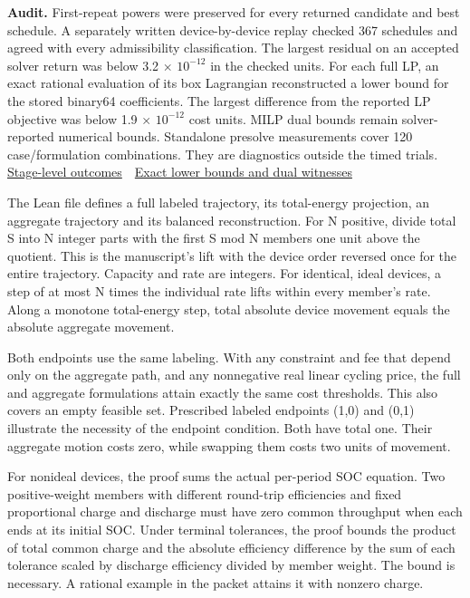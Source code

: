 \documentclass[11pt,letterpaper]{article}
\newcommand{\secname}[1]{\vspace*{2pt}{\LARGE\bfseries\color{accent}#1\par}\vspace{5pt}}
\begin{document}
\textbf{Audit.} First-repeat powers were preserved for every returned candidate and best schedule. A separately written device-by-device replay checked 367 schedules and agreed with every admissibility classification. The largest residual on an accepted solver return was below 3.2 \ensuremath{\times} \ensuremath{10^{-12}} in the checked units. For each full LP, an exact rational evaluation of its box Lagrangian reconstructed a lower bound for the stored binary64 coefficients. The largest difference from the reported LP objective was below 1.9 \ensuremath{\times} \ensuremath{10^{-12}} cost units. MILP dual bounds remain solver-reported numerical bounds. Standalone presolve measurements cover 120 case/formulation combinations. They are diagnostics outside the timed trials. \href{https://github.com/nousentllc/VP-VNP-Review/blob/energy-explorations/energy/W03/results/A/stages_first_repeat.csv}{Stage-level outcomes} \,\textperiodcentered\, \href{https://github.com/nousentllc/VP-VNP-Review/blob/energy-explorations/energy/W03/results/A/exact_lp_certificates.json}{Exact lower bounds and dual witnesses}\par
\clearpage
\secname{W03-B \,\textperiodcentered\, What the formal proof covers}
The Lean file defines a full labeled trajectory, its total-energy projection, an aggregate trajectory and its balanced reconstruction. For N positive, divide total S into N integer parts with the first S mod N members one unit above the quotient. This is the manuscript's lift with the device order reversed once for the entire trajectory. Capacity and rate are integers. For identical, ideal devices, a step of at most N times the individual rate lifts within every member's rate. Along a monotone total-energy step, total absolute device movement equals the absolute aggregate movement.\par
Both endpoints use the same labeling. With any constraint and fee that depend only on the aggregate path, and any nonnegative real linear cycling price, the full and aggregate formulations attain exactly the same cost thresholds. This also covers an empty feasible set. Prescribed labeled endpoints (1,0) and (0,1) illustrate the necessity of the endpoint condition. Both have total one. Their aggregate motion costs zero, while swapping them costs two units of movement.\par
For nonideal devices, the proof sums the actual per-period SOC equation. Two positive-weight members with different round-trip efficiencies and fixed proportional charge and discharge must have zero common throughput when each ends at its initial SOC. Under terminal tolerances, the proof bounds the product of total common charge and the absolute efficiency difference by the sum of each tolerance scaled by discharge efficiency divided by member weight. The bound is necessary. A rational example in the packet attains it with nonzero charge.\par
\end{document}
